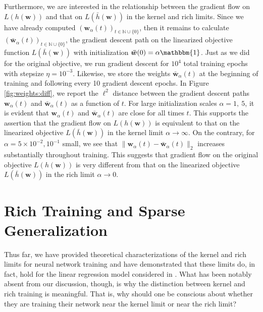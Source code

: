 \documentclass{article}
\begin{document}
Furthermore, we are interested in the relationship between the gradient flow on $L(h(\boldsymbol{w}))$ and that on $L(\bar{h}(\boldsymbol{w}))$ in the kernel and rich limits. Since we have already computed $(\boldsymbol{w}_{\alpha}(t))_{t \in \mathbb{N} \cup \{0\}}$, then it remains to calculate $(\boldsymbol{\bar{w}}_{\alpha}(t))_{t \in \mathbb{N} \cup \{0\}}$, the gradient descent path on the linearized objective function $L(\bar{h}(\boldsymbol{w}))$ with initialization $\boldsymbol{\bar{w}}(0) = \alpha \mathbbm{1}$. Just as we did for the original objective, we run gradient descent for $10^4$ total training epochs with stepsize $\eta = 10^{-3}$. Likewise, we store the weights $\boldsymbol{\bar{w}}_{\alpha}(t)$ at the beginning of training and following every 10 gradient descent epochs. In Figure \ref{fig:weights:diff}, we report the $\ell^2$ distance between the gradient descent paths $\boldsymbol{w}_{\alpha}(t)$ and $\boldsymbol{\bar{w}}_{\alpha}(t)$ as a function of $t$. For large initialization scales $\alpha = 1, \ 5$, it is evident that $\boldsymbol{w}_{\alpha}(t)$ and $\boldsymbol{\bar{w}}_{\alpha}(t)$ are close for all times $t$. This supports the assertion that the gradient flow on $L(h(\boldsymbol{w}))$ is equivalent to that on the linearized objective $L(\bar{h}(\boldsymbol{w}))$ in the kernel limit $\alpha \rightarrow \infty$. On the contrary, for $\alpha = 5 \times 10^{-2}, 10^{-1}$ small, we see that $\| \boldsymbol{w}_{\alpha}(t) - \boldsymbol{\bar{w}}_{\alpha}(t) \|_2$ increases substantially throughout training. This suggests that gradient flow on the original objective $L(h(\boldsymbol{w}))$ is very different from that on the linearized objective $L(\bar{h}(\boldsymbol{w}))$ in the rich limit $\alpha \rightarrow 0$.

\section{Rich Training and Sparse Generalization}\label{richgeneralization}

Thus far, we have provided theoretical characterizations of the kernel and rich limits for neural network training and have demonstrated that these limits do, in fact, hold for the linear regression model considered in \cite{woodworth2020kernel}. What has been notably absent from our discussion, though, is why the distinction between kernel and rich training is meaningful. That is, why should one be conscious about whether they are training their network near the kernel limit or near the rich limit? 
\end{document}
